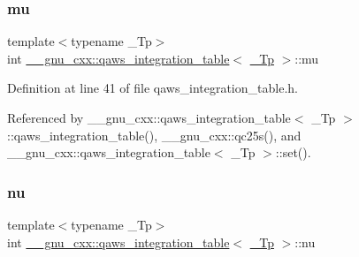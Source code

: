 \mbox{\label{struct____gnu__cxx_1_1qaws__integration__table_a27e7db2fb032dc33759509c9c55546dc}} 
\subsubsection{\texorpdfstring{mu}{mu}}
{\footnotesize\ttfamily template$<$typename \+\_\+\+Tp$>$ \\
int \hyperlink{struct____gnu__cxx_1_1qaws__integration__table}{\+\_\+\+\_\+gnu\+\_\+cxx\+::qaws\+\_\+integration\+\_\+table}$<$ \hyperlink{namespace____gnu__cxx_a3b19a9c800ca194374ef9172290f7d79}{\+\_\+\+Tp} $>$\+::mu}



Definition at line 41 of file qaws\+\_\+integration\+\_\+table.\+h.



Referenced by \+\_\+\+\_\+gnu\+\_\+cxx\+::qaws\+\_\+integration\+\_\+table$<$ \+\_\+\+Tp $>$\+::qaws\+\_\+integration\+\_\+table(), \+\_\+\+\_\+gnu\+\_\+cxx\+::qc25s(), and \+\_\+\+\_\+gnu\+\_\+cxx\+::qaws\+\_\+integration\+\_\+table$<$ \+\_\+\+Tp $>$\+::set().

\mbox{\label{struct____gnu__cxx_1_1qaws__integration__table_acc78257f8dffad045fe66a13b9c7c434}} 
\subsubsection{\texorpdfstring{nu}{nu}}
{\footnotesize\ttfamily template$<$typename \+\_\+\+Tp$>$ \\
int \hyperlink{struct____gnu__cxx_1_1qaws__integration__table}{\+\_\+\+\_\+gnu\+\_\+cxx\+::qaws\+\_\+integration\+\_\+table}$<$ \hyperlink{namespace____gnu__cxx_a3b19a9c800ca194374ef9172290f7d79}{\+\_\+\+Tp} $>$\+::nu}



